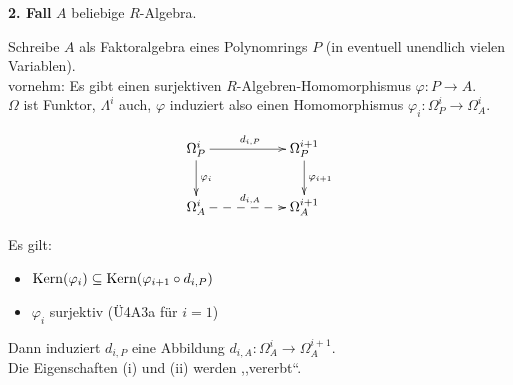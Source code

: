 \begin{SatzDef}
\begin{Bew}
\textbf{2. Fall} $A$ beliebige $R$-Algebra.

Schreibe $A$ als Faktoralgebra eines Polynomrings $P$ (in eventuell unendlich vielen Variablen).\\
vornehm: Es gibt einen surjektiven $R$-Algebren-Homomorphismus $\varphi:P\to A$.\\
$\Omega$ ist Funktor, $\Lambda^i$ auch, $\varphi$ induziert also einen Homomorphismus 
$\varphi_i: \Omega_P^{i}\to \Omega_A^{i}$.

\[
\begin{xy}
\xymatrix{
\Omega_P^i\ar[rr]^{d_{i,P}}\ar[d]^{\varphi_i}&&\Omega_P^{i+1}\ar[d]^{\varphi_{i+1}}\\
\Omega_A^i\ar@{-->}[rr]^{d_{i,A}}&&\Omega_A^{i+1}\\
}
\end{xy}
\]

Es gilt: 
\begin{itemize}
\item $\operatorname{Kern}(\varphi_i)\subseteq \operatorname{Kern}(\varphi_{i+1}\circ d_{i,P})$
\item $\varphi_i$ surjektiv (Ü4A3a für $i=1$)
\end{itemize}

Dann induziert $d_{i,P}$ eine Abbildung $d_{i,A}: \Omega_A^{i}\to \Omega_A^{i+1}$.\\
Die Eigenschaften (i) und (ii) werden ,,vererbt``.

\end{Bew}
\end{SatzDef}

